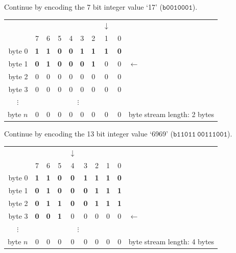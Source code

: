 \documentclass[11pt,letterpaper]{book}
\newcommand{\bin}[1]{\ensuremath{\mathtt{b#1}}}
\numberwithin{equation}{chapter}
\numberwithin{figure}{chapter}
\numberwithin{table}{chapter}
\begin{document}
Continue by encoding the 7 bit integer value `17' (\bin{0010001}).

\begin{tabular}{r|ccccccccl}
\multicolumn{1}{r}{} &&&&&&&$\downarrow$&& \\
         & 7 & 6 & 5 & 4 & 3 & 2 & 1 & 0 & \\\cline{1-9}
byte 0   & \textbf{1} & \textbf{1} & \textbf{0} & \textbf{0} &
           \textbf{1} & \textbf{1} & \textbf{1} & \textbf{0} & \\
byte 1   & \textbf{0} & \textbf{1} & \textbf{0} & \textbf{0} &
           \textbf{0} & \textbf{1} & 0 & 0 & $\leftarrow$      \\
byte 2   & 0 & 0 & 0 & 0 & 0 & 0 & 0 & 0 &                     \\
byte 3   & 0 & 0 & 0 & 0 & 0 & 0 & 0 & 0 &                     \\
\multicolumn{1}{c|}{$\vdots$}&\multicolumn{8}{c}{$\vdots$}&    \\
byte $n$ & 0 & 0 & 0 & 0 & 0 & 0 & 0 & 0 &
byte stream length: 2 bytes
\end{tabular}
\vspace{\baselineskip}

Continue by encoding the 13 bit integer value `6969' (\bin{11011\ 00111001}).

\begin{tabular}{r|ccccccccl}
\multicolumn{1}{r}{} &&&&$\downarrow$&&&&& \\
         & 7 & 6 & 5 & 4 & 3 & 2 & 1 & 0 &            \\\cline{1-9}
byte 0   & \textbf{1} & \textbf{1} & \textbf{0} & \textbf{0} &
           \textbf{1} & \textbf{1} & \textbf{1} & \textbf{0} & \\
byte 1   & \textbf{0} & \textbf{1} & \textbf{0} & \textbf{0} &
           \textbf{0} & \textbf{1} & \textbf{1} & \textbf{1} & \\
byte 2   & \textbf{0} & \textbf{1} & \textbf{1} & \textbf{0} &
           \textbf{0} & \textbf{1} & \textbf{1} & \textbf{1} & \\
byte 3   & \textbf{0} & \textbf{0} & \textbf{1} &
                       0 & 0 & 0 & 0 & 0 & $\leftarrow$        \\
\multicolumn{1}{c|}{$\vdots$}&\multicolumn{8}{c}{$\vdots$}&    \\
byte $n$ & 0 & 0 & 0 & 0 & 0 & 0 & 0 & 0 &
byte stream length: 4 bytes
\end{tabular}
\vspace{\baselineskip}
\end{document}
